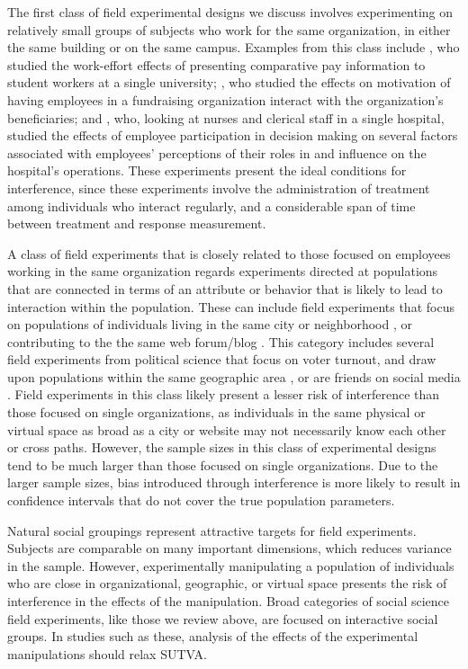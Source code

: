 \documentclass[12pt]{article}
\begin{document}
The first class of field experimental designs we discuss involves experimenting on relatively small groups of subjects who work for the same organization, in either the same building or on the same campus. Examples from this class include \citet{hennig2010search}, who studied the work-effort effects of presenting comparative pay information to student workers at a single university; \citet{grant2007impact}, who studied the effects on motivation of having employees in a fundraising organization interact with the organization's beneficiaries; and \citet{jackson1983participation}, who, looking at nurses and clerical staff in a single hospital, studied the effects of employee participation in decision making on several factors associated with employees' perceptions of their roles in and influence on the hospital's operations. These experiments present the ideal conditions for interference, since these experiments involve the administration of treatment among individuals who interact regularly, and a considerable span of time between treatment and response measurement. 

A class of field experiments that is closely related to those focused on employees working in the same organization regards experiments directed at populations that are connected in terms of an attribute or behavior that is likely to lead to interaction within the population. These can include field experiments that focus on populations of individuals living in the same city or neighborhood \citep[e.g., ][]{costa2013energy}, or contributing to the the same web forum/blog \citep[e.g., ][]{harper2010social}. This category includes several field experiments from political science that focus on voter turnout, and draw upon populations within the same geographic area \citep[e.g., ][]{gerber2000effects,niven2006field}, or are friends on social media \citep[e.g., ][]{Bond:2012}. Field experiments in this class likely present a lesser risk of interference than those focused on single organizations, as individuals in the same physical or virtual space as broad as a city or website may not necessarily know each other or cross paths. However, the sample sizes in this class of experimental designs tend to be much larger than those focused on single organizations. Due to the larger sample sizes, bias introduced through interference is more likely to result in confidence intervals that do not cover the true population parameters.

Natural social groupings represent attractive targets for field experiments. Subjects are comparable on many important dimensions, which reduces variance in the sample. However, experimentally manipulating a population of individuals who are close in organizational, geographic, or virtual space presents the risk of interference in the effects of the manipulation. Broad categories of social science field experiments, like those we review above, are focused on interactive social groups. In studies such as these, analysis of the effects of the experimental manipulations should relax SUTVA.
\end{document}
